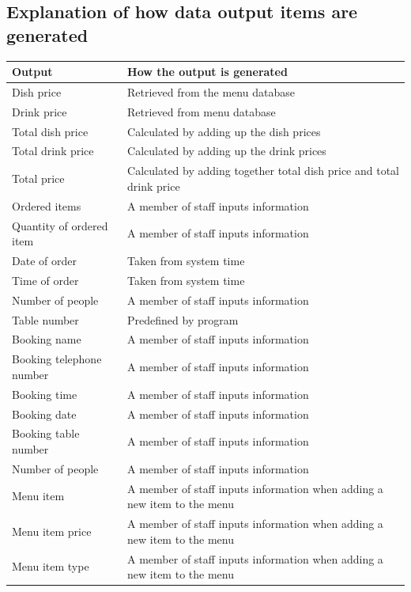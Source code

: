 \subsection{Explanation of how data output items are generated}



\begin{tabular}{ | p{3cm} | p{6cm} |   }
    \hline
    \textbf{Output} & \textbf{How the output is generated} \\ \hline
	Dish price & Retrieved from the menu database \\ \hline
	Drink price & Retrieved from menu database \\ \hline
	Total dish price & Calculated by adding up the dish prices \\ \hline 
	Total drink price &Calculated by adding up the drink prices \\ \hline
	Total price & Calculated by adding together total dish price and total drink price \\ \hline
	Ordered items & A member of staff inputs information \\ \hline
	Quantity of ordered item & A member of staff inputs information \\ \hline
	Date of order & Taken from system time \\ \hline
	Time of order & Taken from system time \\ \hline
	Number of people & A member of staff inputs information \\ \hline
	Table number & Predefined by program \\ \hline
	Booking name & A member of staff inputs information \\ \hline
	Booking telephone number & A member of staff inputs information \\ \hline
	Booking time & A member of staff inputs information \\ \hline
	Booking date & A member of staff inputs information \\ \hline
	Booking table number & A member of staff inputs information \\ \hline
	Number of people & A member of staff inputs information \\ \hline
	Menu item & A member of staff inputs information when adding a new item to the menu \\ \hline
	Menu item price & A member of staff inputs information when adding a new item to the menu \\ \hline
	Menu item type & A member of staff inputs information when adding a new item to the menu \\ \hline


	


     \hline
\end{tabular}
\label{tab:OutputGeneration}

